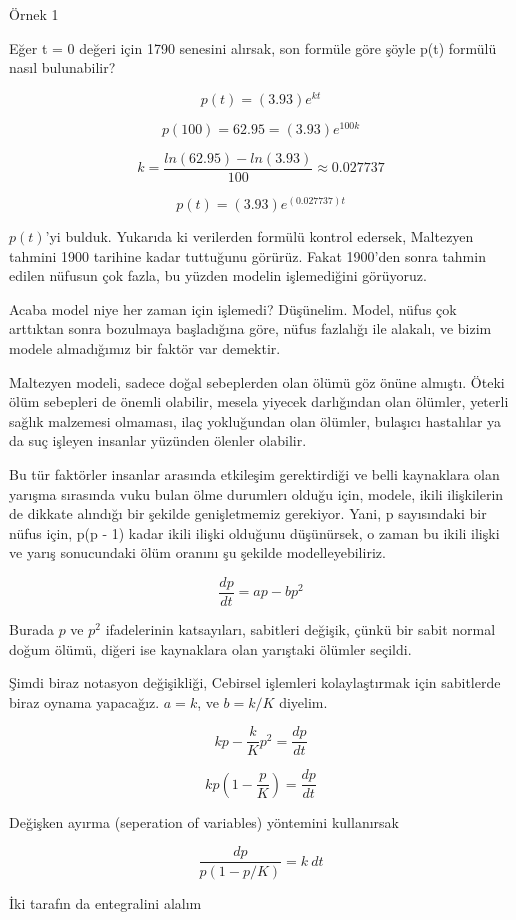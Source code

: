 \documentclass[12pt,fleqn]{article}\usepackage{../../common}
\begin{document}
Örnek 1

Eğer t = 0 değeri için 1790 senesini alırsak, son formüle göre şöyle p(t)
formülü nasıl bulunabilir?

$$ p(t) = (3.93)e^{kt} $$

$$ p(100) = 62.95 = (3.93)e^{100k} $$

$$ k = \frac{ln(62.95)-ln(3.93)}{100} \approx 0.027737 $$

$$ p(t) = (3.93)e^{(0.027737)t} $$

$p(t)$'yi bulduk. Yukarıda ki verilerden formülü kontrol edersek, Maltezyen
tahmini 1900 tarihine kadar tuttuğunu görürüz. Fakat 1900'den sonra tahmin
edilen nüfusun çok fazla, bu yüzden modelin işlemediğini görüyoruz.

Acaba model niye her zaman için işlemedi? Düşünelim. Model, nüfus çok
arttıktan sonra bozulmaya başladığına göre, nüfus fazlalığı ile alakalı, ve
bizim modele almadığımız bir faktör var demektir.

Maltezyen modeli, sadece doğal sebeplerden olan ölümü göz önüne
almıştı. Öteki ölüm sebepleri de önemli olabilir, mesela yiyecek
darlığından olan ölümler, yeterli sağlık malzemesi olmaması, ilaç
yokluğundan olan ölümler, bulaşıcı hastalılar ya da suç işleyen insanlar
yüzünden ölenler olabilir.

Bu tür faktörler insanlar arasında etkileşim gerektirdiği ve belli
kaynaklara olan yarışma sırasında vuku bulan ölme durumlerı olduğu için,
modele, ikili ilişkilerin de dikkate alındığı bir şekilde genişletmemiz
gerekiyor. Yani, p sayısındaki bir nüfus için, p(p - 1) kadar ikili ilişki
olduğunu düşünürsek, o zaman bu ikili ilişki ve yarış sonucundaki ölüm
oranını şu şekilde modelleyebiliriz.

$$ \frac{dp}{dt} = ap - bp^2 $$

Burada $p$ ve $p^2$ ifadelerinin katsayıları, sabitleri değişik, çünkü bir
sabit normal doğum ölümü, diğeri ise kaynaklara olan yarıştaki ölümler
seçildi. 

Şimdi biraz notasyon değişikliği, Cebirsel işlemleri kolaylaştırmak için
sabitlerde biraz oynama yapacağız. $a = k$, ve $b = k/K$ diyelim. 

$$ kp - \frac{k}{K}p^2 = \frac{dp}{dt} $$

$$ kp (1 - \frac{p}{K}) = \frac{dp}{dt} $$

Değişken ayırma (seperation of variables) yöntemini kullanırsak

$$ \frac{dp}{p(1-p/K)}  = k \ dt$$

İki tarafın da entegralini alalım
\end{document}
